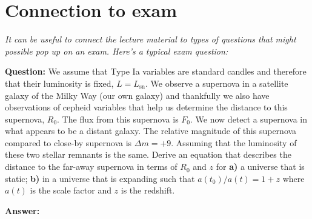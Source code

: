 \documentclass[a4paper,12pt]{article}
\theoremstyle{remark}
\newcommand{\mrm}[1]{\mathrm{#1}}
\renewcommand{\=}[1]{\stackrel{#1}{=}} %
\theoremstyle{plain}
\theoremstyle{definition}
\begin{document}
\section{Connection to exam}
\textit{It can be useful to connect the lecture material to types of questions that might possible pop up on an exam. Here's a typical exam question:}

\textbf{Question:} We assume that Type Ia variables are standard candles and therefore that their luminosity is fixed, $L = L_\mrm{sn}$. We observe a supernova in a satellite galaxy of the Milky Way (our own galaxy) and thankfully we also have observations of cepheid variables that help us determine the distance to this supernova, $R_0$. The flux from this supernova is $F_0$. We now detect a supernova in what appears to be a distant galaxy. The relative magnitude of this supernova compared to close-by supernova is $\Delta m = +9$. Assuming that the luminosity of these two stellar remnants is the same. Derive an equation that describes the distance to the far-away supernova in terms of $R_0$ and $z$ for \textbf{a)} a universe that is static; \textbf{b)} in a universe that is expanding such that $a(t_0)/a(t) = 1 + z$ where $a(t)$ is the scale factor and $z$ is the redshift.

\textbf{Answer:} 
\end{document}
